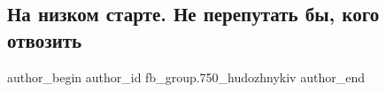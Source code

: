  
 
 
 
 

\subsection{На низком старте. Не перепутать бы, кого отвозить}
\label{sec:03_04_2018.fb.fb_group.750_hudozhnykiv.2.na_nizkom_starte_ne_pereputat_by_kogo_otvozit}

\ifcmt
 author_begin
   author_id fb_group.750_hudozhnykiv
 author_end
\fi
